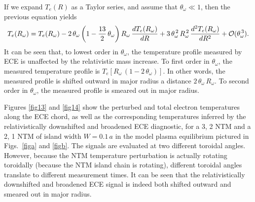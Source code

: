 \documentclass[12pt,prb,aps]{revtex4-1}
\begin{document}
 If we expand $T_e(R)$ as a Taylor series, and assume that $\theta_\omega \ll 1$, then the previous equation yields 
\begin{equation}
T_e(R_\omega) = T_e(R_\omega) - 2\,\theta_\omega\left(1-\frac{13}{2}\,\theta_\omega\right) R_\omega\,\frac{d T_e(R_\omega)}{dR} + 3\,\theta_\omega^{\,2}\,R_\omega^{\,2}\,
\frac{d^2 T_e(R_\omega)}{dR^2} + {\cal O}(\theta_\omega^{\,3}).
\end{equation}
It can be seen that, to lowest order in $\theta_\omega$, the temperature profile measured by ECE is unaffected by the relativistic mass increase. To first order in $\theta_\omega$, the
measured temperature profile is $T_e[R_\omega\,(1-2\,\theta_\omega)]$. In other words, the measured profile is shifted outward in major radius a
distance $2\,\theta_\omega\,R_\omega$. To second order in $\theta_\omega$,
the measured profile is smeared out in major radius. 

Figures \ref{fig13} and \ref{fig14} show the perturbed and total electron temperatures along the ECE chord, as well as the corresponding temperatures inferred by the relativistically 
downshifted and broadened ECE diagnostic, for a
3, 2 NTM and a 2, 1 NTM of island width $W=0.1\,a$  in the model plasma equilibrium pictured in Figs.~\ref{figa} and \ref{figb}. The signals are evaluated at two different toroidal angles. However, because the
NTM temperature perturbation is actually rotating toroidally (because the NTM island chain is rotating), different toroidal angles translate to different measurement times. It can be seen that the relativistically downshifted and 
broadened ECE signal is indeed both shifted outward and  smeared out in major radius. 
\end{document}
